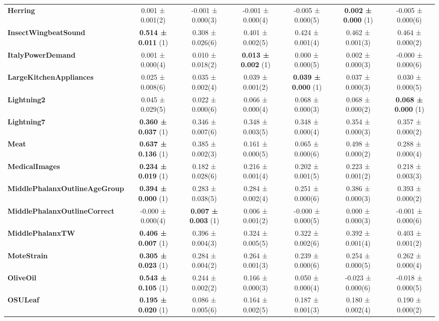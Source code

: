 \begin{table}[ht]
\begin{adjustbox}{width=\textwidth}
\begin{tabular}{lcccccc}
    \textbf{Herring} & 0.001 ± 0.001(2) & -0.001 ± 0.000(3) & -0.001 ± 0.000(4) & -0.005 ± 0.000(5) & \textbf{0.002 ± 0.000} (1) & -0.005 ± 0.000(6) \\
    \textbf{InsectWingbeatSound} & \textbf{0.514 ± 0.011} (1) & 0.308 ± 0.026(6) & 0.401 ± 0.002(5) & 0.424 ± 0.001(4) & 0.462 ± 0.001(3) & 0.464 ± 0.000(2) \\
    \textbf{ItalyPowerDemand} & 0.001 ± 0.000(4) & 0.010 ± 0.018(2) & \textbf{0.013 ± 0.002} (1) & 0.000 ± 0.000(5) & 0.002 ± 0.000(3) & -0.000 ± 0.000(6) \\
    \textbf{LargeKitchenAppliances} & 0.025 ± 0.008(6) & 0.035 ± 0.002(4) & 0.039 ± 0.001(2) & \textbf{0.039 ± 0.000} (1) & 0.037 ± 0.000(3) & 0.030 ± 0.000(5) \\
    \textbf{Lightning2} & 0.045 ± 0.029(5) & 0.022 ± 0.000(6) & 0.066 ± 0.000(4) & 0.068 ± 0.000(3) & 0.068 ± 0.000(2) & \textbf{0.068 ± 0.000} (1) \\
    \textbf{Lightning7} & \textbf{0.360 ± 0.037} (1) & 0.346 ± 0.007(6) & 0.348 ± 0.003(5) & 0.348 ± 0.000(4) & 0.354 ± 0.000(3) & 0.357 ± 0.000(2) \\
    \textbf{Meat} & \textbf{0.637 ± 0.136} (1) & 0.385 ± 0.002(3) & 0.161 ± 0.000(5) & 0.065 ± 0.000(6) & 0.498 ± 0.000(2) & 0.288 ± 0.000(4) \\
    \textbf{MedicalImages} & \textbf{0.234 ± 0.019} (1) & 0.182 ± 0.028(6) & 0.216 ± 0.001(4) & 0.202 ± 0.001(5) & 0.223 ± 0.001(2) & 0.218 ± 0.003(3) \\
    \textbf{MiddlePhalanxOutlineAgeGroup} & \textbf{0.394 ± 0.000} (1) & 0.283 ± 0.038(5) & 0.284 ± 0.002(4) & 0.251 ± 0.000(6) & 0.386 ± 0.000(3) & 0.393 ± 0.000(2) \\
    \textbf{MiddlePhalanxOutlineCorrect} & -0.000 ± 0.000(4) & \textbf{0.007 ± 0.003} (1) & 0.006 ± 0.001(2) & -0.000 ± 0.000(5) & 0.000 ± 0.000(3) & -0.001 ± 0.000(6) \\
    \textbf{MiddlePhalanxTW} & \textbf{0.406 ± 0.007} (1) & 0.396 ± 0.004(3) & 0.324 ± 0.005(5) & 0.322 ± 0.002(6) & 0.392 ± 0.001(4) & 0.403 ± 0.001(2) \\
    \textbf{MoteStrain} & \textbf{0.305 ± 0.023} (1) & 0.284 ± 0.004(2) & 0.264 ± 0.001(3) & 0.239 ± 0.000(6) & 0.254 ± 0.000(5) & 0.262 ± 0.000(4) \\
    \textbf{OliveOil} & \textbf{0.543 ± 0.105} (1) & 0.244 ± 0.002(2) & 0.166 ± 0.000(3) & 0.050 ± 0.000(4) & -0.023 ± 0.000(6) & -0.018 ± 0.000(5) \\
    \textbf{OSULeaf} & \textbf{0.195 ± 0.020} (1) & 0.086 ± 0.005(6) & 0.164 ± 0.002(5) & 0.187 ± 0.001(3) & 0.180 ± 0.002(4) & 0.190 ± 0.000(2) \\

\end{tabular}
\end{adjustbox}
\end{table}
